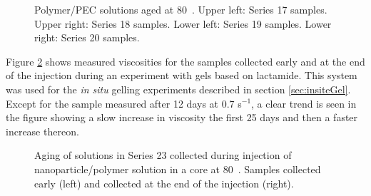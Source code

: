 \documentclass[nanomaterials,article,submit,moreauthors,pdftex]{Definitions/mdpi}
\begin{document}
\begin{figure}[h!]
    \centering
    \caption{Polymer/PEC solutions aged at 80~\celsius. Upper left: Series 17 samples. Upper right: Series 18 samples. Lower left: Series 19 samples. Lower right: Series 20 samples.}
    \label{cht:s17visc80}
\end{figure}

Figure \ref{cht:s23visc80} shows measured viscosities for the samples collected early and at the end of the injection during an experiment with gels based on lactamide.
This system was used for the \textit{in situ} gelling experiments described in section \ref{sec:insiteGel}. Except for the sample measured after 12 days at 0.7 s$^{-1}$, a clear trend is seen in the figure showing a slow increase in viscosity the first 25 days and then a faster increase thereon.

\begin{figure}[h!] 
    \centering
    \caption{Aging of solutions in Series 23 collected during injection of nanoparticle/polymer solution in a core at 80~\celsius. Samples collected early (left) and collected at the end of the injection (right).}
    \label{cht:s23visc80}
\end{figure} 
\end{document}
